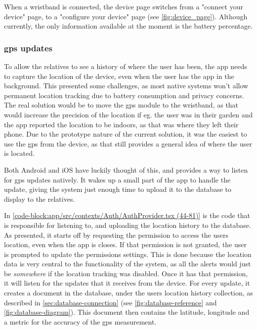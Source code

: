 When a wristband is connected, the device page switches from a "connect your device" page, to a "configure your device" page (see \autoref{fig:device_page}). Although currently, the only information available at the moment is the battery percentage.


\subsubsection{\gls{gps} updates}
To allow the relatives to see a history of where the user has been, the app needs to capture the location of the device, even when the user has the app in the background. This presented some challenges, as most native systems won't allow permanent location tracking due to battery consumption and privacy concerns. The real solution would be to move the \gls{gps} module to the wristband, as that would increase the precision of the location if eg. the user was in their garden and the app reported the location to be indoors, as that was where they left their phone. Due to the prototype nature of the current solution, it was the easiest to use the \gls{gps} from the device, as that still provides a general idea of where the user is located.

Both Android and iOS have luckily thought of this, and provides a way to listen for \gls{gps} updates natively. It wakes up a small part of the app to handle the update, giving the system just enough time to upload it to the database to display to the relatives.

\clearpage
{}


In \autoref{code-block:app/src/contexts/Auth/AuthProvider.tsx (44-81)} is the code that is responsible for listening to, and uploading the location history to the database. As presented, it starts off by requesting the permission to access the users location, even when the app is closes. If that permission is not granted, the user is prompted to update the permissions settings. This is done because the location data is very central to the functionality of the system, as all the alerts would just be \textit{somewhere} if the location tracking was disabled. Once it has that permission, it will listen for the updates that it receives from the device. For every update, it creates a document in the database, under the users location history collection, as described in \autoref{sec:database-connection} (see \autoref{fig:database-reference} and \autoref{fig:database-diagram}). This document then contains the latitude, longitude and a metric for the accuracy of the \gls{gps} measurement.

    